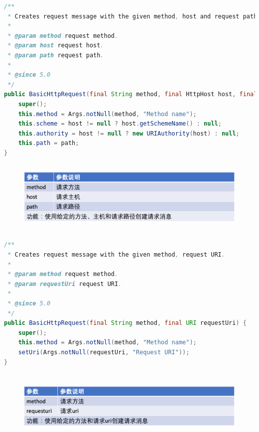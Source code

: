 \documentclass{article}
\begin{document}
	\begin{lstlisting}[language={java}]
/**
 * Creates request message with the given method, host and request path.
 *
 * @param method request method.
 * @param host request host.
 * @param path request path.
 *
 * @since 5.0
 */
public BasicHttpRequest(final String method, final HttpHost host, final String path) {
    super();
    this.method = Args.notNull(method, "Method name");
    this.scheme = host != null ? host.getSchemeName() : null;
    this.authority = host != null ? new URIAuthority(host) : null;
    this.path = path;
}

	\end{lstlisting}
	\begin{figure}[H]
		\centering
		\includegraphics[height = 3.5cm, width = 18cm]{pics/19_Request_table_2_5.png}	
	\end{figure}

	\begin{lstlisting}[language={java}]
/**
 * Creates request message with the given method, request URI.
 *
 * @param method request method.
 * @param requestUri request URI.
 *
 * @since 5.0
 */
public BasicHttpRequest(final String method, final URI requestUri) {
    super();
    this.method = Args.notNull(method, "Method name");
    setUri(Args.notNull(requestUri, "Request URI"));
}

	\end{lstlisting}
	\begin{figure}[H]
		\centering
		\includegraphics[height = 3.5cm, width = 18cm]{pics/20_Request_table_3_6.png}	
	\end{figure}
\end{document}
